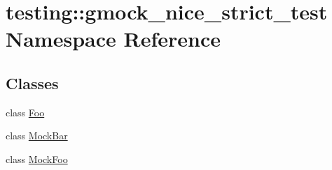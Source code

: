 \hypertarget{namespacetesting_1_1gmock__nice__strict__test}{}\section{testing\+:\+:gmock\+\_\+nice\+\_\+strict\+\_\+test Namespace Reference}
\label{namespacetesting_1_1gmock__nice__strict__test}
\subsection*{Classes}
\begin{DoxyCompactItemize}
\item 
class \hyperlink{classtesting_1_1gmock__nice__strict__test_1_1Foo}{Foo}
\item 
class \hyperlink{classtesting_1_1gmock__nice__strict__test_1_1MockBar}{Mock\+Bar}
\item 
class \hyperlink{classtesting_1_1gmock__nice__strict__test_1_1MockFoo}{Mock\+Foo}
\end{DoxyCompactItemize}
